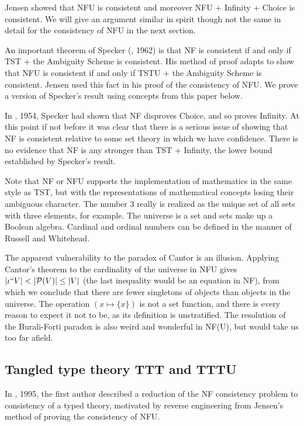 \documentclass{article}
\theoremstyle{definition}
\theoremstyle{remark}
\begin{document}
{Jensen showed that NFU is consistent and moreover NFU + Infinity + Choice is consistent.  We will give an argument similar in spirit though not the same in detail for the consistency of NFU in the next section.

An important theorem of Specker (\cite{ambiguity}, 1962) is that NF is consistent if and only if TST + the Ambiguity Scheme is consistent.  His method of proof adapts to show that  NFU is consistent if and only if TSTU + the Ambiguity Scheme is consistent.  Jensen used this fact in his proof of the consistency of NFU.  We prove a version of Specker's result using concepts from this paper below.

In \cite{notac}, 1954, Specker had shown that NF disproves Choice, and so proves Infinity.  At this point if not before it was clear that there is a serious issue of showing that NF is consistent relative to some set theory in which we have confidence.  There is no evidence that NF is any stronger than TST + Infinity, the lower bound established by Specker's result.

Note that NF or NFU supports the implementation of mathematics in the same style as TST, but with the representations of mathematical concepts losing their ambiguous character.  The number 3 really is realized as the unique set of all sets with three elements, for example.  The universe is a set and sets make up a Boolean algebra.   Cardinal and ordinal numbers can be defined
in the manner of Russell and Whitehead.

The apparent vulnerability to the paradox of Cantor is an illusion.  Applying Cantor's theorem to the cardinality of the universe in NFU gives $|\iota``V| < |{\cal P}(V)| \leq |V|$ (the last inequality would be an equation in NF), from which we conclude that there are fewer singletons of objects than objects in the universe.  The operation $(x \mapsto \{x\})$ is not a set function, and there is every reason to expect it not to be, as its definition is unstratified.  The resolution of the Burali-Forti paradox is also weird and wonderful in NF(U), but would take us too far afield.

\newpage

\subsection{Tangled type theory TTT and TTTU}

In \cite{tangled}, 1995, the first author described a reduction of the NF consistency problem to consistency of a typed theory,  motivated by reverse engineering from Jensen's method of proving the consistency of NFU.

}
\end{document}
